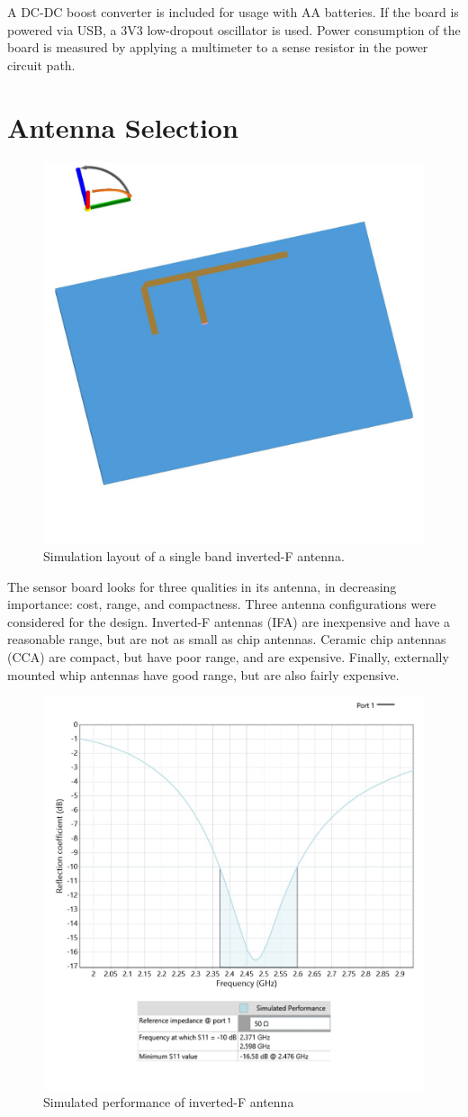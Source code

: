 A DC-DC boost converter is included for usage with AA batteries. If the board is powered via USB, a 3V3 low-dropout oscillator is used. Power consumption of the board is measured by applying a multimeter to a sense resistor in the power circuit path.

\section{Antenna Selection}

\begin{figure}[h]
\centering
\includegraphics[width=0.5\linewidth]{images/antenna-sketch}
\caption[IFA Layout]{Simulation layout of a single band inverted-F antenna.}
\label{fig:pifa}
\end{figure}

The sensor board looks for three qualities in its antenna, in decreasing importance: cost, range, and compactness. Three antenna configurations were considered for the design. Inverted-F antennas (IFA) are inexpensive and have a reasonable range, but are not as small as chip antennas. Ceramic chip antennas (CCA) are compact, but have poor range, and are expensive. Finally, externally mounted whip antennas have good range, but are also fairly expensive.

\begin{figure}[h]
\centering
\includegraphics[width=0.5\linewidth]{images/antenna-performance}
\caption[IFA Performance]{Simulated performance of inverted-F antenna}
\label{fig:pifaperf}
\end{figure}

